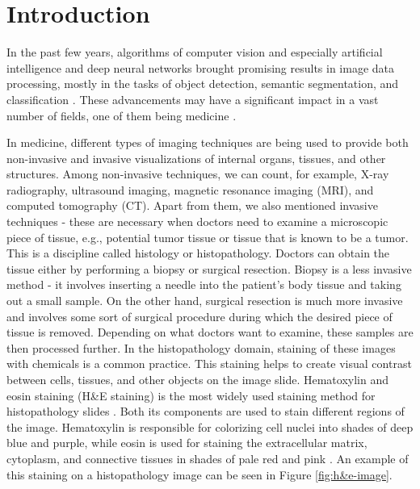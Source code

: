 \chapter{Introduction}
\label{chapter:intro}


In the past few years, algorithms of computer vision and especially artificial intelligence and deep neural networks brought promising results in image data processing, mostly in the tasks of object detection, semantic segmentation, and classification \cite{LeCun2015}. These advancements may have a significant impact in a vast number of fields, one of them being medicine \cite{Hu2023, He2023, Wemmert2021}. 

In medicine, different types of imaging techniques are being used to provide both non-invasive and invasive visualizations of internal organs, tissues, and other structures. Among non-invasive techniques, we can count, for example, X-ray radiography, ultrasound imaging, magnetic resonance imaging (MRI), and computed tomography (CT). Apart from them, we also mentioned invasive techniques - these are necessary when doctors need to examine a microscopic piece of tissue, e.g., potential tumor tissue or tissue that is known to be a tumor. This is a discipline called histology or histopathology. Doctors can obtain the tissue either by performing a biopsy or surgical resection. Biopsy is a less invasive method - it involves inserting a needle into the patient's body tissue and taking out a small sample. On the other hand, surgical resection is much more invasive and involves some sort of surgical procedure during which the desired piece of tissue is removed. Depending on what doctors want to examine, these samples are then processed further. In the histopathology domain, staining of these images with chemicals is a common practice. This staining helps to create visual contrast between cells, tissues, and other objects on the image slide. Hematoxylin and eosin staining (H\&E staining) is the most widely used staining method for histopathology slides \cite{Dey2022}. Both its components are used to stain different regions of the image. Hematoxylin is responsible for colorizing cell nuclei into shades of deep blue and purple, while eosin is used for staining the extracellular matrix, cytoplasm, and connective tissues in shades of pale red and pink \cite{Dey2022}. An example of this staining on a histopathology image can be seen in Figure \ref{fig:h&e-image}.

